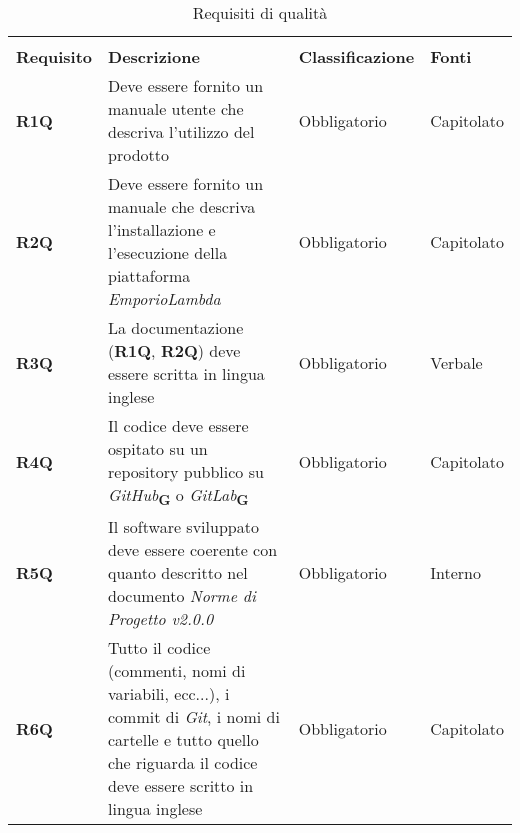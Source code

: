 \begin{center}
    \centering
    \renewcommand{\arraystretch}{1.8}
    \label{tab:RequisitiQualita}
    \begin{longtable}[!h]{p{50px} p{200px} p{100px} p{50px}}
        \rowcolor{white}\caption{Requisiti di qualità}                                                                                                                                                                                                                                    \\
        \rowcolor{logo!70} \textbf{Requisito} & \textbf{Descrizione}                                                                                                                                                            & \textbf{Classificazione} & \textbf{Fonti}               \\
        \textbf{R1Q}                          & Deve essere fornito un manuale utente che descriva l'utilizzo del prodotto                                                                                                      & Obbligatorio             & Capitolato                   \\
        \textbf{R2Q}                          & Deve essere fornito un manuale che descriva l'installazione e l'esecuzione della piattaforma \textit{EmporioLambda}                                                             & Obbligatorio             & Capitolato                   \\
        \textbf{R3Q}                          & La documentazione (\textbf{R1Q}, \textbf{R2Q}) deve essere scritta in lingua inglese                                                                                            & Obbligatorio             & Verbale                      \\
        \textbf{R4Q}                          & Il codice deve essere ospitato su un repository pubblico su \textit{GitHub}\textsubscript{\textbf{G}} o \textit{GitLab}\textsubscript{\textbf{G}}                              & Obbligatorio             & Capitolato                   \\
        \textbf{R5Q}                          & Il software sviluppato deve essere coerente con quanto descritto nel documento \textit{Norme di Progetto v2.0.0}                                                                & Obbligatorio             & Interno                      \\
        \textbf{R6Q}                          & Tutto il codice (commenti, nomi di variabili, ecc...), i commit di \textit{Git}, i nomi di cartelle e tutto quello che riguarda il codice deve essere scritto in lingua inglese & Obbligatorio             & Capitolato                   \\

\end{longtable}
\end{center}

